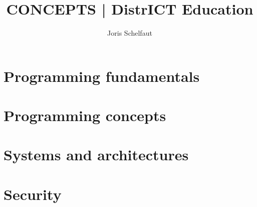 \documentclass[a4paper,twoside,10pt]{book}
\title{CONCEPTS | DistrICT Education}
\author{Joris Schelfaut}
\date{}
\begin{document}
\maketitle

\cleardoublepage %
\pagestyle{fancy} %


\rmfamily
\setcounter{page}{0}



\pagestyle{empty} %
\tableofcontents %

\setcounter{page}{0}


\part{Programming fundamentals}\label{part:programming-fundamentals}





\part{Programming concepts}\label{part:programming-concepts}





\part{Systems and architectures}\label{part:systems-and-architectures}




\part{Security}\label{part:security}




\end{document}
